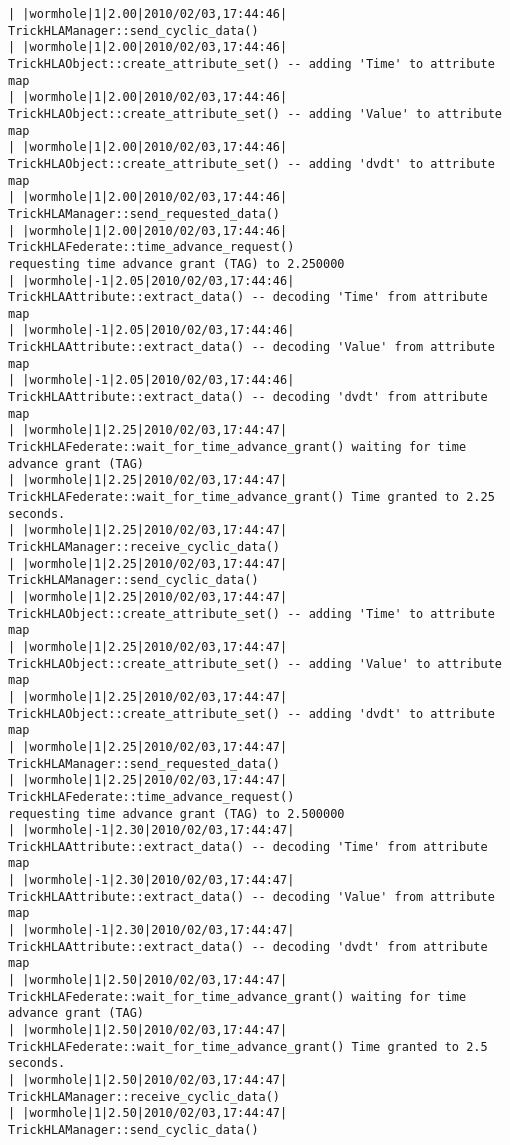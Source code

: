\begin{lstlisting}[numbers=none,caption={output showing conditionally sent cyclic data}]
| |wormhole|1|2.00|2010/02/03,17:44:46| TrickHLAManager::send_cyclic_data()
| |wormhole|1|2.00|2010/02/03,17:44:46| TrickHLAObject::create_attribute_set() -- adding 'Time' to attribute map
| |wormhole|1|2.00|2010/02/03,17:44:46| TrickHLAObject::create_attribute_set() -- adding 'Value' to attribute map
| |wormhole|1|2.00|2010/02/03,17:44:46| TrickHLAObject::create_attribute_set() -- adding 'dvdt' to attribute map
| |wormhole|1|2.00|2010/02/03,17:44:46| TrickHLAManager::send_requested_data()
| |wormhole|1|2.00|2010/02/03,17:44:46| TrickHLAFederate::time_advance_request()   
requesting time advance grant (TAG) to 2.250000
| |wormhole|-1|2.05|2010/02/03,17:44:46| TrickHLAAttribute::extract_data() -- decoding 'Time' from attribute map
| |wormhole|-1|2.05|2010/02/03,17:44:46| TrickHLAAttribute::extract_data() -- decoding 'Value' from attribute map
| |wormhole|-1|2.05|2010/02/03,17:44:46| TrickHLAAttribute::extract_data() -- decoding 'dvdt' from attribute map
| |wormhole|1|2.25|2010/02/03,17:44:47| TrickHLAFederate::wait_for_time_advance_grant() waiting for time advance grant (TAG)
| |wormhole|1|2.25|2010/02/03,17:44:47| TrickHLAFederate::wait_for_time_advance_grant() Time granted to 2.25 seconds.
| |wormhole|1|2.25|2010/02/03,17:44:47| TrickHLAManager::receive_cyclic_data()
| |wormhole|1|2.25|2010/02/03,17:44:47| TrickHLAManager::send_cyclic_data()
| |wormhole|1|2.25|2010/02/03,17:44:47| TrickHLAObject::create_attribute_set() -- adding 'Time' to attribute map
| |wormhole|1|2.25|2010/02/03,17:44:47| TrickHLAObject::create_attribute_set() -- adding 'Value' to attribute map
| |wormhole|1|2.25|2010/02/03,17:44:47| TrickHLAObject::create_attribute_set() -- adding 'dvdt' to attribute map
| |wormhole|1|2.25|2010/02/03,17:44:47| TrickHLAManager::send_requested_data()
| |wormhole|1|2.25|2010/02/03,17:44:47| TrickHLAFederate::time_advance_request()   
requesting time advance grant (TAG) to 2.500000
| |wormhole|-1|2.30|2010/02/03,17:44:47| TrickHLAAttribute::extract_data() -- decoding 'Time' from attribute map
| |wormhole|-1|2.30|2010/02/03,17:44:47| TrickHLAAttribute::extract_data() -- decoding 'Value' from attribute map
| |wormhole|-1|2.30|2010/02/03,17:44:47| TrickHLAAttribute::extract_data() -- decoding 'dvdt' from attribute map
| |wormhole|1|2.50|2010/02/03,17:44:47| TrickHLAFederate::wait_for_time_advance_grant() waiting for time advance grant (TAG)
| |wormhole|1|2.50|2010/02/03,17:44:47| TrickHLAFederate::wait_for_time_advance_grant() Time granted to 2.5 seconds.
| |wormhole|1|2.50|2010/02/03,17:44:47| TrickHLAManager::receive_cyclic_data()
| |wormhole|1|2.50|2010/02/03,17:44:47| TrickHLAManager::send_cyclic_data()

\end{lstlisting}
